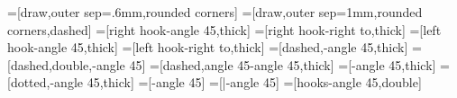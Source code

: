 \usetikzlibrary{arrows}
\newcommand{\mmtarrowtip}{angle 45}
\newcommand{\mmtreversearrowtip}{angle 45 reversed}
\newcommand{\mmtarrowtipepi}{triangle 45}
\newcommand{\mmtarrowtipmonoright}{right hook}
\newcommand{\mmtarrowtipmonoleft}{left hook}
\newcommand{\mmtarrowtippartial}{right to}
\newcommand\mmtthy[3]{\def\@test{#3}%
\begin{array}{l}\textsf{#1}\\\hline #2\ifx\@test\@empty\else\\\hline #3\fi\end{array}}
=[draw,outer sep=.6mm,rounded corners]
=[draw,outer sep=1mm,rounded corners,dashed]
=[\mmtarrowtipmonoright-\mmtarrowtip,thick]
=[\mmtarrowtipmonoright-\mmtarrowtippartial,thick]
=[\mmtarrowtipmonoleft-\mmtarrowtip,thick]
=[\mmtarrowtipmonoleft-\mmtarrowtippartial,thick]
=[dashed,-\mmtarrowtip,thick]
=[dashed,double,-\mmtarrowtip]
=[dashed,\mmtarrowtip-\mmtarrowtip,thick]
=[-\mmtarrowtip,thick]
=[dotted,-\mmtarrowtip,thick]
=[-\mmtarrowtip] %
=[|-\mmtarrowtip] %
=[hooks-\mmtarrowtip,double] %
